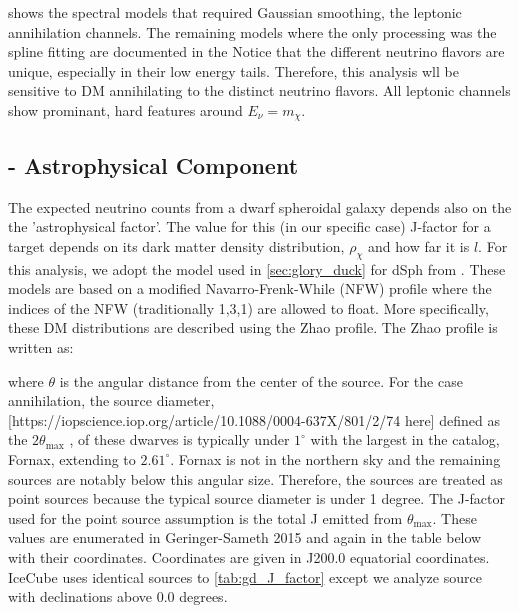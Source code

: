  shows the spectral models that required Gaussian smoothing, the leptonic annihilation channels.
The remaining models where the only processing was the spline fitting are documented in the 
Notice that the different neutrino flavors are unique, especially in their low energy tails.
Therefore, this analysis wll be sensitive to DM annihilating to the distinct neutrino flavors.
All leptonic channels show prominant, hard features around $E_\nu = m_\chi$.


\subsection{\J - Astrophysical Component}\label{sec:icDM_spatialmodel}

The expected neutrino counts from a dwarf spheroidal galaxy depends also on the the 'astrophysical factor'.
The value for this (in our specific case) J-factor for a target depends on its dark matter density distribution, $\rho_{\chi}$ and how far it is $ l $.
For this analysis, we adopt the \GS model used in \cref{sec:glory_duck} for dSph from \cite{Geringer_Sameth_2015}.
These models are based on a modified Navarro-Frenk-While (NFW) profile where the indices of the NFW (traditionally 1,3,1) are allowed to float.
More specifically, these DM distributions are described using the Zhao profile.
The Zhao profile is written as:

%
%
%

where $ \theta $ is the angular distance from the center of the source.
For the case annihilation, the source diameter, [https://iopscience.iop.org/article/10.1088/0004-637X/801/2/74 here] defined as the $ 2 \theta_{\mathrm{max}} $ , of these dwarves is typically under $ 1^{\circ} $ with the largest in the catalog, Fornax, extending to $ 2.61^{\circ} $.
Fornax is not in the northern sky and the remaining sources are notably below this angular size.
Therefore, the sources are treated as point sources because the typical source diameter is under 1 degree.
The J-factor used for the point source assumption is the total J emitted from $ \theta_{\mathrm{max}} $.
These values are enumerated in Geringer-Sameth 2015 and again in the table below with their coordinates.
Coordinates are given in J200.0 equatorial coordinates.
IceCube uses identical sources to \cref{tab:gd_J_factor} except we analyze source with declinations above 0.0 degrees.

